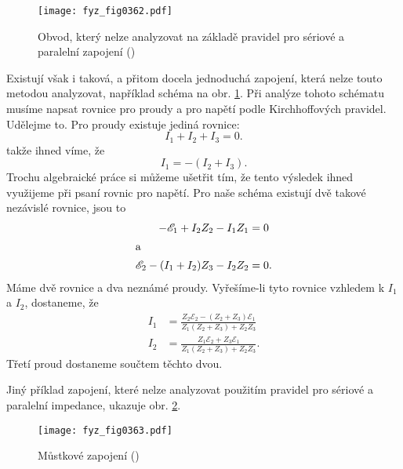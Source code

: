   \begin{figure}[ht!] %
    \centering
    \texttt{[image: fyz\_fig0362.pdf]}
    \caption{Obvod, který nelze analyzovat na základě pravidel pro sériové a paralelní zapojení
             (\cite[s.~403]{Feynman02})}
    \label{fyz:fig0362}
  \end{figure}
   
  Existují však i taková, a přitom docela jednoduchá zapojení, která nelze touto metodou 
  analyzovat, například schéma na obr. \ref{fyz:fig0362}. Při analýze tohoto schématu musíme napsat 
  rovnice pro proudy a pro napětí podle Kirchhoffových pravidel. Udělejme to. Pro proudy existuje 
  jediná rovnice:
  \begin{equation*}
    I_1 + I_2 + I_3 = 0.
  \end{equation*}
  takže ihned víme, že
  \begin{equation*}
    I_1 = - (I_2 + I_3).
  \end{equation*}
  Trochu algebraické práce si můžeme ušetřit tím, že tento výsledek ihned využijeme při psaní 
  rovnic pro napětí. Pro naše schéma existují dvě takové nezávislé rovnice, jsou to
  \begin{align*}
   -\mathscr{E}_1 + I_2Z_2 - I_1Z_1         &= 0 \\
   \shortintertext{a}
    \mathscr{E}_2 - (I_1 + I_2)Z_3 - I_2Z_2 &= 0.
  \end{align*}
  Máme dvě rovnice a dva neznámé proudy. Vyřešíme-li tyto rovnice vzhledem k \(I_1\) a \(I_2\), 
  dostaneme,  že 
  \begin{subequations}\label{fyz:eq491}
    \begin{align}
      I_1 &=\frac{Z_2\mathscr{E}_2-(Z_2+Z_3)\mathscr{E}_1}{Z_1(Z_2+Z_3)+Z_2Z_3}\label{fyz:eq491a} \\
      I_2 &=\frac{Z_1\mathscr{E}_2+Z_3\mathscr{E}_1}{Z_1(Z_2+Z_3)+Z_2Z_3}.     \label{fyz:eq491b}
    \end{align}
  \end{subequations}
  Třetí proud dostaneme součtem těchto dvou.
  
  Jiný příklad zapojení, které nelze analyzovat použitím pravidel pro sériové a paralelní 
  impedance, ukazuje obr. \ref{fyz:fig0363}.
  
  
  \begin{figure}[ht!] %
    \centering
    \texttt{[image: fyz\_fig0363.pdf]}
    \caption{Můstkové zapojení
             (\cite[s.~403]{Feynman02})}
    \label{fyz:fig0363}
  \end{figure}
  

